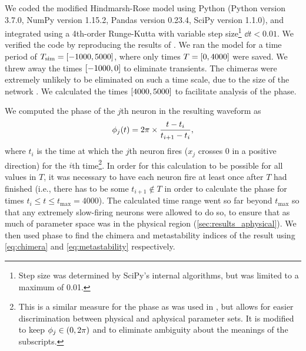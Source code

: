 We coded the modified Hindmarsh-Rose model using Python (Python version 3.7.0, NumPy version 1.15.2, Pandas version 0.23.4, SciPy version 1.1.0), and integrated using a 4th-order Runge-Kutta with variable step size\footnote{Step size was determined by SciPy's internal algorithms, but was limited to a maximum of 0.01.} $\dd{t} < 0.01$.
We verified the code by reproducing the results of \cite{Santos2017}.
We ran the model for a time period of $T_{\text{sim}} = \bqty{-1000, 5000}$, where only times $T = \bqty{0, 4000}$ were saved.
We threw away the times $\bqty{-1000, 0}$ to eliminate transients.
The chimeras were extremely unlikely to be eliminated on such a time scale, due to the size of the network \cite{Wolfrum2011}.
We calculated the times $\bqty{4000, 5000}$ to facilitate analysis of the phase.

We computed the phase of the $j$th neuron in the resulting waveform as
\begin{equation}
  \label{eq:hr_phase}
  \phase_{j}(t)
  =
  2 \pi \times \frac{t - t_{i}}{t_{i + 1} - t_{i}},
\end{equation}
where $t_{i}$ is the time at which the $j$th neuron fires ($x_{j}$ crosses 0 in a positive direction) for the $i$th time\footnote{This is a similar measure for the phase as was used in \cite{Santos2017}, but allows for easier discrimination between physical and aphysical parameter sets.
  It is modified to keep $\phase_{j} \in \pqty{0, 2\pi}$ and to eliminate ambiguity about the meanings of the subscripts.
}.
In order for this calculation to be possible for all values in $T$, it was necessary to have each neuron fire at least once after $T$ had finished (i.e., there has to be some $t_{i + 1} \notin T$ in order to calculate the phase for times $t_{i} \leq t \leq t_{\text{max}} = 4000$).
The calculated time range went so far beyond $t_{\text{max}}$ so that any extremely slow-firing neurons were allowed to do so, to ensure that as much of parameter space was in the physical region (\cref{sec:results_aphysical}).
We then used phase to find the chimera and metastability indices of the result using \cref{eq:chimera} and \cref{eq:metastability} respectively.

